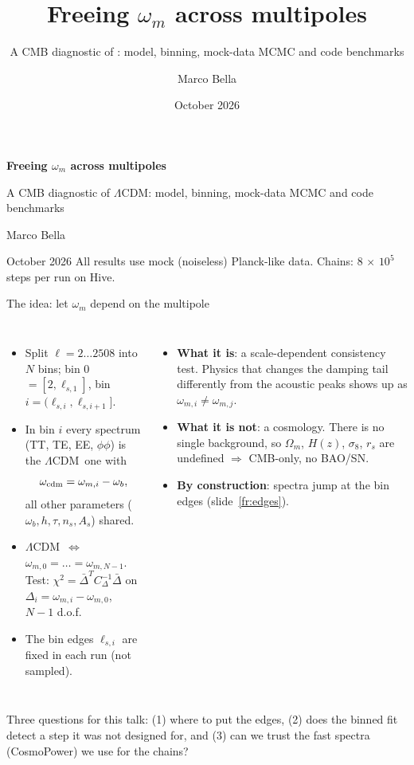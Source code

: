 \documentclass[aspectratio=169,10pt]{beamer}
\title{Freeing $\omega_m$ across multipoles}
\subtitle{A CMB diagnostic of \lcdm: model, binning, mock-data MCMC and code benchmarks}
\author{Marco Bella}
\institute{Knox Research Group, UC Davis}
\date{October 2026}
\newcommand{\takeaway}[1]{%
  \begin{beamercolorbox}[wd=\textwidth,sep=0.45em]{}\colorbox{wash}{\parbox{\dimexpr\textwidth-2\fboxsep}{\small #1}}\end{beamercolorbox}}
\newcommand{\lcdm}{$\Lambda$CDM}
\begin{document}
\begin{frame}[plain]
  \vfill
  {\color{ink}\LARGE\bfseries Freeing $\omega_m$ across multipoles\par}
  \vspace{0.4em}
  {\color{muted}\large A CMB diagnostic of \lcdm: model, binning, mock-data MCMC and code benchmarks\par}
  \vspace{0.8em}{\color{accent}\rule{0.6\textwidth}{0.8pt}}\par\vspace{0.8em}
  Marco Bella \par
  {\color{muted}October 2026}
  \vfill
  {\color{muted}\scriptsize All results use mock (noiseless) Planck-like data. Chains: 8 $\times$ $10^5$ steps per run on Hive.}
\end{frame}

\begin{frame}{The idea: let $\omega_m$ depend on the multipole}
\begin{columns}[T]
\begin{itemize}
  \item Split $\ell = 2\ldots2508$ into $N$ bins; bin 0 $=[2,\ell_{s,1}]$, bin $i=(\ell_{s,i},\ell_{s,i+1}]$.
  \item In bin $i$ every spectrum (TT, TE, EE, $\phi\phi$) is the \lcdm\ one with
  \[ \omega_{\rm cdm} = \omega_{m,i}-\omega_b , \]
  all other parameters ($\omega_b, h, \tau, n_s, A_s$) shared.
  \item \lcdm\ $\Leftrightarrow$ $\omega_{m,0}=\dots=\omega_{m,N-1}$.\\
  Test: $\chi^2 = \bar\Delta^{T} C_\Delta^{-1}\bar\Delta$ on $\Delta_i=\omega_{m,i}-\omega_{m,0}$, $N-1$ d.o.f.
  \item The bin edges $\ell_{s,i}$ are fixed in each run (not sampled).
\end{itemize}
\begin{itemize}
  \item[] {\bfseries What it is}: a scale-dependent consistency test. Physics that changes the damping tail differently from the
  acoustic peaks shows up as $\omega_{m,i}\neq\omega_{m,j}$.
  \item[] {\bfseries What it is not}: a cosmology. There is no single background, so $\Omega_m$, $H(z)$, $\sigma_8$, $r_s$ are undefined
  $\Rightarrow$ CMB-only, no BAO/SN.
  \item[] {\bfseries By construction}: spectra jump at the bin edges (slide~\ref{fr:edges}).
\end{itemize}
\end{columns}
\vspace{0.6em}
\takeaway{Three questions for this talk: (1) where to put the edges, (2) does the binned fit detect a step it was not designed for,
and (3) can we trust the fast spectra (CosmoPower) we use for the chains?}
\end{frame}
\end{document}
